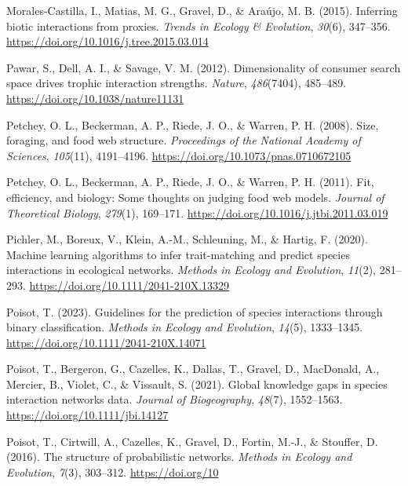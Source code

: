 \documentclass[
]{article}
\newlength{\cslhangindent}
\newenvironment{CSLReferences}[2] %
 {\begin{list}{}{%
  \setlength{\itemindent}{0pt}
  \setlength{\leftmargin}{0pt}
  \setlength{\parsep}{0pt}
  \ifodd #1
   \setlength{\leftmargin}{\cslhangindent}
   \setlength{\itemindent}{-1\cslhangindent}
  \fi
  \setlength{\itemsep}{#2\baselineskip}}}
 {\end{list}}
\begin{document}
\begin{CSLReferences}{1}{0}
Morales-Castilla, I., Matias, M. G., Gravel, D., \& Araújo, M. B.
(2015). Inferring biotic interactions from proxies. \emph{Trends in
Ecology \& Evolution}, \emph{30}(6), 347--356.
\url{https://doi.org/10.1016/j.tree.2015.03.014}

Pawar, S., Dell, A. I., \& Savage, V. M. (2012). Dimensionality of
consumer search space drives trophic interaction strengths.
\emph{Nature}, \emph{486}(7404), 485--489.
\url{https://doi.org/10.1038/nature11131}

Petchey, O. L., Beckerman, A. P., Riede, J. O., \& Warren, P. H. (2008).
Size, foraging, and food web structure. \emph{Proceedings of the
National Academy of Sciences}, \emph{105}(11), 4191--4196.
\url{https://doi.org/10.1073/pnas.0710672105}

Petchey, O. L., Beckerman, A. P., Riede, J. O., \& Warren, P. H. (2011).
Fit, efficiency, and biology: {Some} thoughts on judging food web
models. \emph{Journal of Theoretical Biology}, \emph{279}(1), 169--171.
\url{https://doi.org/10.1016/j.jtbi.2011.03.019}

Pichler, M., Boreux, V., Klein, A.-M., Schleuning, M., \& Hartig, F.
(2020). Machine learning algorithms to infer trait-matching and predict
species interactions in ecological networks. \emph{Methods in Ecology
and Evolution}, \emph{11}(2), 281--293.
\url{https://doi.org/10.1111/2041-210X.13329}

Poisot, T. (2023). Guidelines for the prediction of species interactions
through binary classification. \emph{Methods in Ecology and Evolution},
\emph{14}(5), 1333--1345. \url{https://doi.org/10.1111/2041-210X.14071}

Poisot, T., Bergeron, G., Cazelles, K., Dallas, T., Gravel, D.,
MacDonald, A., Mercier, B., Violet, C., \& Vissault, S. (2021). Global
knowledge gaps in species interaction networks data. \emph{Journal of
Biogeography}, \emph{48}(7), 1552--1563.
\url{https://doi.org/10.1111/jbi.14127}

Poisot, T., Cirtwill, A., Cazelles, K., Gravel, D., Fortin, M.-J., \&
Stouffer, D. (2016). The structure of probabilistic networks.
\emph{Methods in Ecology and Evolution}, \emph{7}(3), 303--312.
\url{https://doi.org/10}


\end{CSLReferences}
\end{document}

